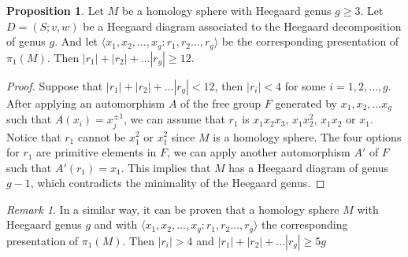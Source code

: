 \documentclass[pdflatex,sn-mathphys-num]{sn-jnl}%
\theoremstyle{plain}
\theoremstyle{definition}
\newtheorem{proposition}[theorem]{Proposition}
\theoremstyle{remark}
\newtheorem*{remark}{Remark}
\begin{document}
\begin{proposition}\label{prop:Fico2}
    Let $M$ be a homology sphere with Heegaard genus $g\geq 3$. Let  $D=(S; v,w)$ be a Heegaard diagram associated to the Heegaard decomposition of genus $g$. And let $\langle x_1, x_2, \dots, x_g : r_1, r_2 \dots , r_g \rangle$ be the corresponding presentation of $\pi_1(M)$. Then $|r_1|+|r_2|+\dots |r_g| \geq 12$.

\begin{proof}
    Suppose that  $|r_1|+|r_2|+\dots |r_g| < 12$, then  $|r_i|<4$ for some $i=1,2, \dots, g$. After applying an automorphism $A$ of the free group $F$ generated by $x_1, x_2, \dots x_g$ such that $A(x_i)=x_j^{\pm1}$, we can assume that $r_1$ is $x_1x_2x_3$, $x_1x_2^2$, $x_1x_2$ or $x_1$. Notice that $r_1$ cannot be $x_1^2$ or $x_1^2$ since $M$ is a homology sphere. The four options for $r_1$ are primitive elements in $F$, we can apply another automorphism $A'$ of $F$ such that $A'(r_1)=x_1$. This implies that $M$ has a Heegaard diagram of genus $g-1$, which contradicts the minimality of the Heegaard genus. 
\end{proof}
\end{proposition}

\begin{remark}
    In a similar way, it can be proven that a homology sphere $M$ with Heegaard genus $g$ and with  $\langle x_1, x_2, \dots, x_g : r_1, r_2 \dots , r_g \rangle$ the corresponding presentation of $\pi_1(M)$. Then $|r_i|>4$ and $|r_1|+|r_2|+\dots |r_g| \geq 5g$
\end{remark}




\clearpage
\end{document}
